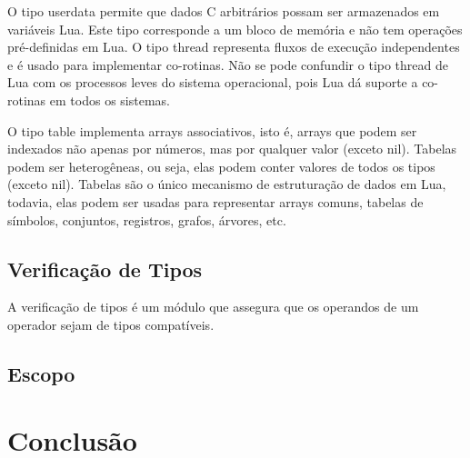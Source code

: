 \documentclass[
	12pt,				%
	openright,			%
	twoside,			%
	a4paper,			%
	english,			%
	brazil,				%
	]{abntex2}
\begin{document}
O tipo userdata permite que dados C arbitrários possam ser armazenados em variáveis Lua. Este tipo corresponde a um bloco de memória e não tem operações pré-definidas em Lua. O tipo thread representa fluxos de execução independentes e é usado para implementar co-rotinas. Não se pode confundir o tipo thread de Lua com os processos leves do sistema operacional, pois Lua dá suporte a co-rotinas em todos os sistemas.

O tipo table implementa arrays associativos, isto é, arrays que podem ser indexados não apenas por números, mas por qualquer valor (exceto nil). Tabelas podem ser heterogêneas, ou seja, elas podem conter valores de todos os tipos (exceto nil). Tabelas são o único mecanismo de estruturação de dados em Lua, todavia, elas podem ser usadas para representar arrays comuns, tabelas de símbolos, conjuntos, registros, grafos, árvores, etc.

\section{Verificação de Tipos}
A verificação de tipos é um módulo que assegura que os operandos de um operador sejam de tipos compatíveis.

\section{Escopo}


\chapter{Conclusão}
\postextual



\cite{nome}


\end{document}
